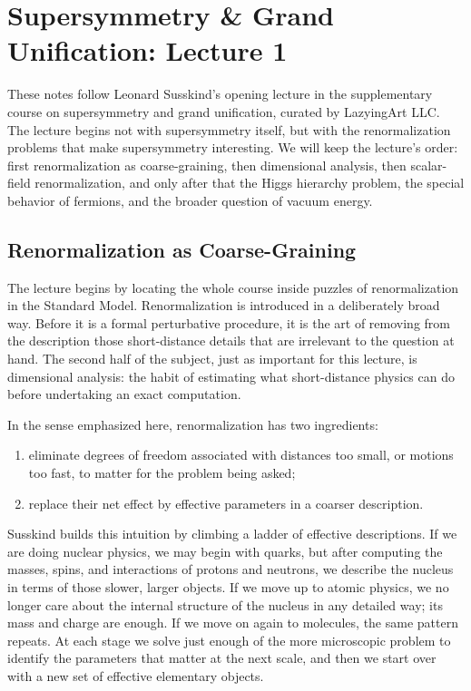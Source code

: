 \chapter{Supersymmetry \& Grand Unification: Lecture 1}

These notes follow Leonard Susskind's opening lecture in the supplementary course on supersymmetry and grand unification, curated by LazyingArt LLC. The lecture begins not with supersymmetry itself, but with the renormalization problems that make supersymmetry interesting. We will keep the lecture's order: first renormalization as coarse-graining, then dimensional analysis, then scalar-field renormalization, and only after that the Higgs hierarchy problem, the special behavior of fermions, and the broader question of vacuum energy.

\section{Renormalization as Coarse-Graining}

The lecture begins by locating the whole course inside puzzles of renormalization in the Standard Model. Renormalization is introduced in a deliberately broad way. Before it is a formal perturbative procedure, it is the art of removing from the description those short-distance details that are irrelevant to the question at hand. The second half of the subject, just as important for this lecture, is dimensional analysis: the habit of estimating what short-distance physics can do before undertaking an exact computation.

\begin{definition}
In the sense emphasized here, renormalization has two ingredients:
\begin{enumerate}
\item eliminate degrees of freedom associated with distances too small, or motions too fast, to matter for the problem being asked;
\item replace their net effect by effective parameters in a coarser description.
\end{enumerate}
\end{definition}

Susskind builds this intuition by climbing a ladder of effective descriptions. If we are doing nuclear physics, we may begin with quarks, but after computing the masses, spins, and interactions of protons and neutrons, we describe the nucleus in terms of those slower, larger objects. If we move up to atomic physics, we no longer care about the internal structure of the nucleus in any detailed way; its mass and charge are enough. If we move on again to molecules, the same pattern repeats. At each stage we solve just enough of the more microscopic problem to identify the parameters that matter at the next scale, and then we start over with a new set of effective elementary objects.

